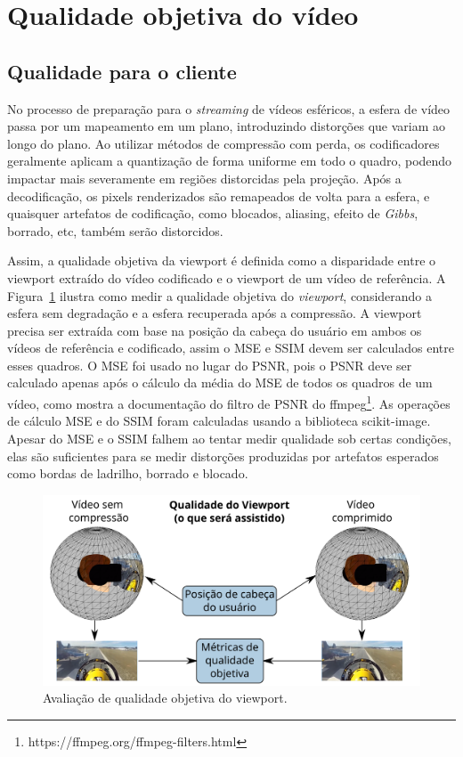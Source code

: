 {\section{Qualidade objetiva do vídeo}

\subsection{Qualidade para o cliente}
No processo de preparação para o \textit{streaming} de vídeos esféricos, a esfera de vídeo passa por um mapeamento em um plano, introduzindo distorções que variam ao longo do plano. Ao utilizar métodos de compressão com perda, os codificadores geralmente aplicam a quantização de forma uniforme em todo o quadro, podendo impactar mais severamente em regiões distorcidas pela projeção. Após a decodificação, os pixels renderizados são remapeados de volta para a esfera, e quaisquer artefatos de codificação, como blocados, aliasing, efeito de \textit{Gibbs}, borrado, etc, também serão distorcidos.

Assim, a qualidade objetiva da viewport é definida como a disparidade entre o viewport extraído do vídeo codificado e o viewport de um vídeo de referência.   A Figura~\ref{fig:QualityWorkflow} ilustra como medir a qualidade objetiva do \textit{viewport}, considerando a esfera sem degradação e a esfera recuperada após a compressão. A viewport precisa ser extraída com base na posição da cabeça do usuário em ambos os vídeos de referência e codificado, assim o MSE e SSIM devem ser calculados entre esses quadros. O MSE foi usado no lugar do PSNR, pois o PSNR deve ser calculado apenas após o cálculo da média do MSE de todos os quadros de um vídeo, como mostra a documentação do filtro de PSNR do ffmpeg\footnote{https://ffmpeg.org/ffmpeg-filters.html}. As operações de cálculo MSE e do SSIM foram calculadas usando a biblioteca scikit-image. Apesar do MSE e o SSIM falhem ao tentar medir qualidade sob certas condições, elas são suficientes para se medir distorções produzidas por artefatos esperados como bordas de ladrilho, borrado e blocado.~\cite{Bovik2009} 

\begin{figure}[ht]
        \centering
        \includegraphics[width=0.8\linewidth]{fig/Project_Quality_Workflow_2.png}
        \caption{Avaliação de qualidade objetiva do viewport.}
        \label{fig:QualityWorkflow}
\end{figure}

}

